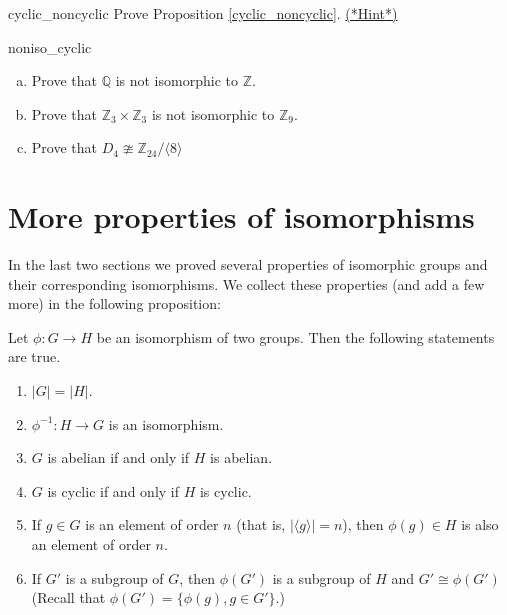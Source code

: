\begin{exercise}{cyclic_noncyclic} 
Prove Proposition \ref{cyclic_noncyclic}.
\hyperref[sec:isomorph:hints]{(*Hint*)}
\end{exercise}



\begin{exercise}{noniso_cyclic}
\begin{enumerate}[(a)]
\item
Prove that ${\mathbb Q}$ is not isomorphic to ${\mathbb Z}$.
\item
Prove that  ${\mathbb Z}_3 \times {\mathbb Z}_3$ is not isomorphic to ${\mathbb Z}_9$. 
\item
Prove that  $D_4 \ncong {\mathbb Z}_{24} / \langle 8 \rangle$
\end{enumerate}
\end{exercise}



\section{More properties of isomorphisms}\label{iso_properties}
In the last two sections we  proved several properties of isomorphic groups and their corresponding isomorphisms.  We collect these properties (and add a few more) in the following proposition:

\begin{thm}\label{isomorph_theorem_1}
Let $\phi : G \rightarrow H$ be an isomorphism of two groups.  Then the following statements are true. 
\begin{enumerate}[(1)]
 

\rm \item 
$|G| = |H|$. 

\rm \item 
$\phi^{-1} : H \rightarrow G$ is an isomorphism. 

\rm \item 
$G$ is abelian if and only if $H$ is abelian. 

\rm \item 
$G$ is cyclic if and only if $H$ is cyclic. 

\rm \item
If $g \in G$ is an element of order $n$ (that is, $| \langle g \rangle | = n$), then 
$\phi(g) \in H$ is also an element of order $n$.

\rm \item 
If $G'$  is a subgroup of $G$, then $\phi(G') $ is a subgroup of  $H$ and $G' \cong \phi(G')$  (Recall that $\phi(G') = \{ \phi(g), g \in G'\}$.)
 
\end{enumerate}
\end{thm}

